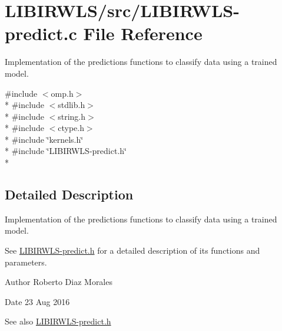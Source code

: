\hypertarget{LIBIRWLS-predict_8c}{}\section{L\+I\+B\+I\+R\+W\+L\+S/src/\+L\+I\+B\+I\+R\+W\+L\+S-\/predict.c File Reference}
\label{LIBIRWLS-predict_8c}


Implementation of the predictions functions to classify data using a trained model.  


{\ttfamily \#include $<$omp.\+h$>$}\\*
{\ttfamily \#include $<$stdlib.\+h$>$}\\*
{\ttfamily \#include $<$string.\+h$>$}\\*
{\ttfamily \#include $<$ctype.\+h$>$}\\*
{\ttfamily \#include \char`\"{}kernels.\+h\char`\"{}}\\*
{\ttfamily \#include \char`\"{}L\+I\+B\+I\+R\+W\+L\+S-\/predict.\+h\char`\"{}}\\*


\subsection{Detailed Description}
Implementation of the predictions functions to classify data using a trained model. 

See \hyperlink{LIBIRWLS-predict_8h}{L\+I\+B\+I\+R\+W\+L\+S-\/predict.\+h} for a detailed description of its functions and parameters.

\begin{DoxyAuthor}{Author}
Roberto Diaz Morales 
\end{DoxyAuthor}
\begin{DoxyDate}{Date}
23 Aug 2016
\end{DoxyDate}
\begin{DoxySeeAlso}{See also}
\hyperlink{LIBIRWLS-predict_8h}{L\+I\+B\+I\+R\+W\+L\+S-\/predict.\+h} 
\end{DoxySeeAlso}
